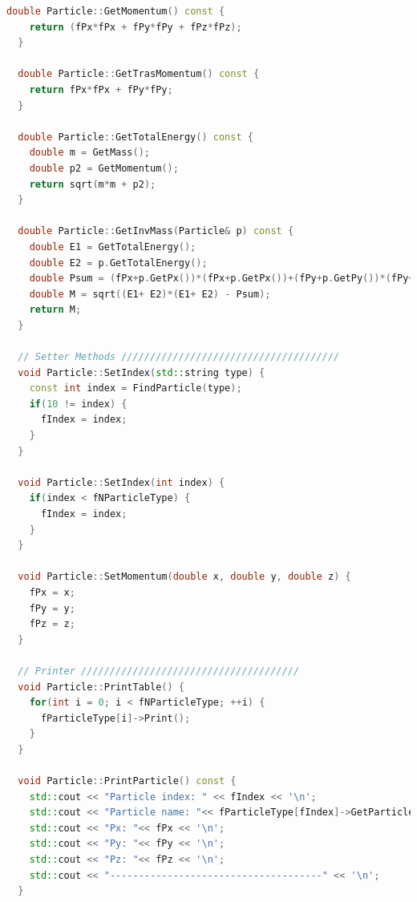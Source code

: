 \documentclass[a4paper, 11pt]{article}
\begin{document}
\begin{lstlisting}[language=c++, style=code]
  double Particle::GetMomentum() const {
    return (fPx*fPx + fPy*fPy + fPz*fPz);
  }

  double Particle::GetTrasMomentum() const {
    return fPx*fPx + fPy*fPy;
  }

  double Particle::GetTotalEnergy() const {
    double m = GetMass();
    double p2 = GetMomentum();
    return sqrt(m*m + p2);
  }

  double Particle::GetInvMass(Particle& p) const {
    double E1 = GetTotalEnergy();
    double E2 = p.GetTotalEnergy();
    double Psum = (fPx+p.GetPx())*(fPx+p.GetPx())+(fPy+p.GetPy())*(fPy+p.GetPy())+(fPz+p.GetPz())*(fPz+p.GetPz());
    double M = sqrt((E1+ E2)*(E1+ E2) - Psum);
    return M;
  }

  // Setter Methods //////////////////////////////////////
  void Particle::SetIndex(std::string type) {
    const int index = FindParticle(type);
    if(10 != index) {
      fIndex = index;
    }
  }

  void Particle::SetIndex(int index) {
    if(index < fNParticleType) {
      fIndex = index;
    }
  }

  void Particle::SetMomentum(double x, double y, double z) {
    fPx = x;
    fPy = y;
    fPz = z;
  }

  // Printer //////////////////////////////////////
  void Particle::PrintTable() {
    for(int i = 0; i < fNParticleType; ++i) {
      fParticleType[i]->Print();
    }
  }

  void Particle::PrintParticle() const {
    std::cout << "Particle index: " << fIndex << '\n';
    std::cout << "Particle name: "<< fParticleType[fIndex]->GetParticleName() << '\n';
    std::cout << "Px: "<< fPx << '\n';
    std::cout << "Py: "<< fPy << '\n';
    std::cout << "Pz: "<< fPz << '\n';
    std::cout << "-------------------------------------" << '\n';
  }


\end{lstlisting}
\end{document}
